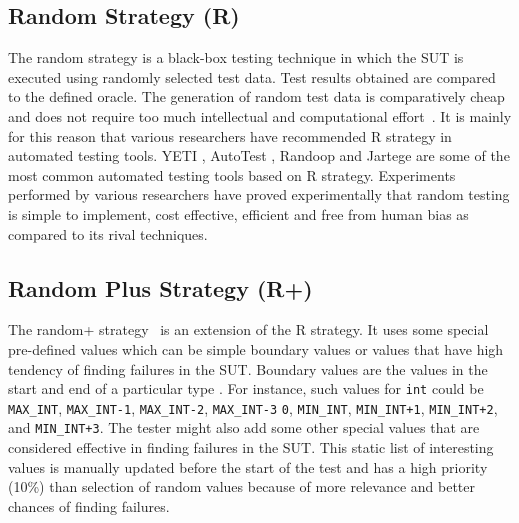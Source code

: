 \documentclass[conference]{IEEEtran}
\begin{document}
\subsection{Random Strategy (R)}
\noindent The random strategy is a black-box testing technique in which the SUT is executed using randomly selected test data. Test results obtained are compared to the defined oracle.%
\noindent The generation of random test data is comparatively cheap and does not require too much intellectual and computational effort~\cite{Ciupa2009}. It is mainly for this reason that various researchers have recommended R strategy in automated testing tools. YETI \cite{Oriol2010a}, AutoTest \cite{Leitner2007}, Randoop \cite{Pacheco2007} and Jartege \cite{Oriat2004} are some of the most common automated testing tools based on R strategy. Experiments performed by various researchers \cite{Ciupa2007, Duran1984, Hamlet1994} have proved experimentally that random testing is simple to implement, cost effective, efficient and free from human bias as compared to its rival techniques.


\subsection{Random Plus Strategy (R+)}
\noindent The random+ strategy~\cite{Leitner2007} is an extension of the R strategy. It uses some special pre-defined values which can be simple boundary values or values that have high tendency of finding failures in the SUT. Boundary values are the values in the start and end of a particular type \cite{Beizer1990}. For instance, such values for \verb+int+ could be \verb+MAX_INT+, \verb+MAX_INT-1+, \verb+MAX_INT-2+, \verb+MAX_INT-3+ \verb+0+, \verb+MIN_INT+, \verb-MIN_INT+1-, \verb-MIN_INT+2-, and \verb-MIN_INT+3-. The tester might also add some other special values that are considered effective in finding failures in the SUT. This static list of interesting values is manually updated before the start of the test and has a high priority (10\%) than selection of random values because of more relevance and better chances of finding failures.
\end{document}
